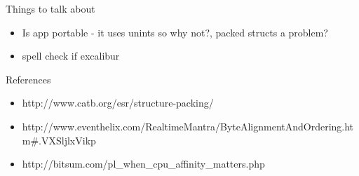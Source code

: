 \documentclass[a4paper, titlepage]{article}
\begin{document}

\listoftodos

\newpage

Things to talk about

\begin{itemize}
	\item Is app portable - it uses unints so why not?, packed structs a problem?
	\item spell check if excalibur
\end{itemize}

References

\begin{itemize}
	\item http://www.catb.org/esr/structure-packing/
	\item http://www.eventhelix.com/RealtimeMantra/ByteAlignmentAndOrdering.htm\#.VXSljlxVikp
	\item http://bitsum.com/pl\_when\_cpu\_affinity\_matters.php
\end{itemize}

\newpage


\newpage

\newpage

\newpage
\tableofcontents
\newpage

\newpage

\newpage

\newpage

\newpage

\newpage

\newpage

%
%

\newpage

\end{document}
